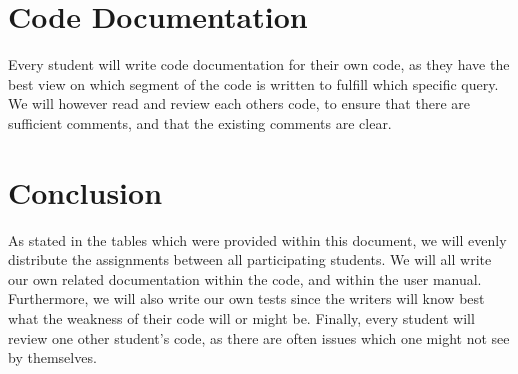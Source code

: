 \documentclass{article}
\begin{document}
\section{Code Documentation}
Every student will write code documentation for their own code, as they have the best view on which segment of the code is written to fulfill which specific query. We will however read and review each others code, to ensure that there are sufficient comments, and that the existing comments are clear.
\section{Conclusion}
As stated in the tables which were provided within this document, we will evenly distribute the assignments between all participating students. We will all write our own related documentation within the code, and within the user manual. Furthermore, we will also write our own tests since the writers will know best what the weakness of their code will or might be. Finally, every student will review one other student's code, as there are often issues which one might not see by themselves.
\end{document}
